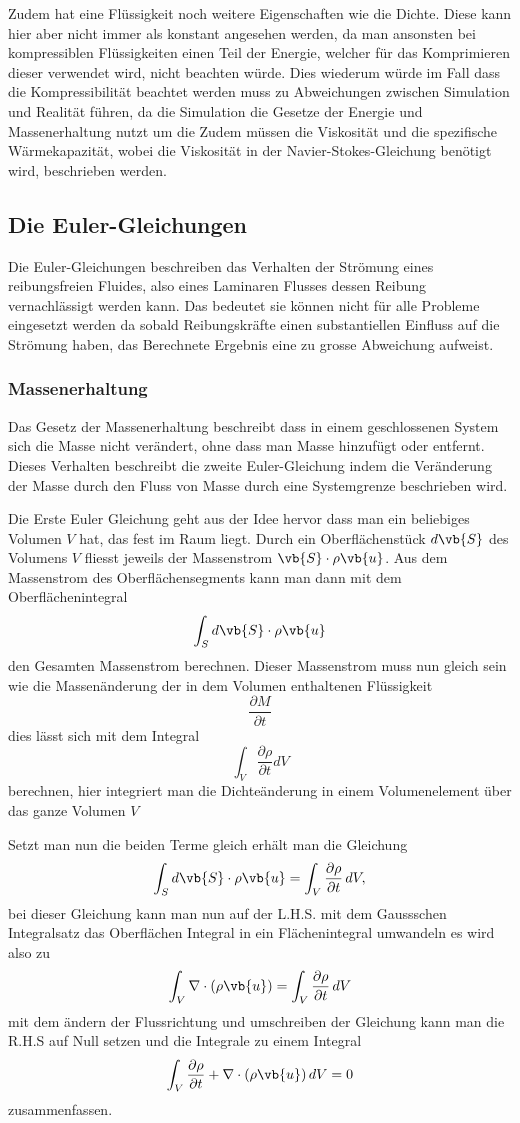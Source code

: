 Zudem hat eine Flüssigkeit noch weitere Eigenschaften wie die Dichte. 
Diese kann hier aber nicht immer als konstant angesehen werden, da man ansonsten bei kompressiblen Flüssigkeiten einen Teil der Energie, welcher für das Komprimieren dieser verwendet wird, nicht beachten würde.
Dies wiederum würde im Fall dass die Kompressibilität beachtet werden muss zu Abweichungen zwischen Simulation und Realität führen, da die Simulation die Gesetze der Energie und Massenerhaltung nutzt um die 
Zudem müssen die Viskosität und die spezifische Wärmekapazität, wobei die Viskosität in der Navier-Stokes-Gleichung benötigt wird, beschrieben werden.

\subsection{Die Euler-Gleichungen}
Die Euler-Gleichungen beschreiben das Verhalten der Strömung eines reibungsfreien Fluides, also eines Laminaren Flusses dessen Reibung vernachlässigt werden kann. 
Das bedeutet sie können nicht für alle Probleme eingesetzt werden da sobald Reibungskräfte einen substantiellen Einfluss auf die Strömung haben, das Berechnete Ergebnis eine zu grosse Abweichung aufweist.

\subsubsection{Massenerhaltung}
Das Gesetz der Massenerhaltung beschreibt dass in einem geschlossenen System sich die Masse nicht verändert, ohne dass man Masse hinzufügt oder entfernt. 
Dieses Verhalten beschreibt die zweite Euler-Gleichung indem die Veränderung der Masse durch den Fluss von Masse durch eine Systemgrenze beschrieben wird.

Die Erste Euler Gleichung geht aus der Idee hervor dass man ein beliebiges Volumen $V$ hat, das fest im Raum liegt. Durch ein Oberflächenstück 
$d \vb{S} $ 
des Volumens 
$V$
 fliesst jeweils der Massenstrom 
$\vb{S} \cdot\rho\vb{u}$.
Aus dem Massenstrom des Oberflächensegments kann man dann mit dem Oberflächenintegral 
\[\int_{S}d\vb{S}\cdot\rho\vb{u}\]
den Gesamten Massenstrom berechnen. Dieser Massenstrom muss nun gleich sein wie die Massenänderung der in dem Volumen enthaltenen Flüssigkeit 
\[\frac{\partial M}{\partial t}\]
dies lässt sich mit dem Integral 
\[\int_{V}\frac{\partial \rho}{\partial t} dV\]
berechnen, hier integriert man die Dichteänderung in einem Volumenelement über das ganze Volumen 
$V$ 

Setzt man nun die beiden Terme gleich erhält man die Gleichung 
\[\int_{S}d\vb{S}\cdot\rho\vb{u} 
=
\int_{V}\frac{\partial \rho}{\partial t} \, dV ,\] 
bei dieser Gleichung kann man nun auf der L.H.S. mit dem Gaussschen Integralsatz das Oberflächen Integral in ein Flächenintegral umwandeln es wird also zu
\[\int_{V}\nabla\cdot(\rho\vb{u}) 
=
\int_{V}\frac{\partial \rho}{\partial t} \, dV \]
mit dem ändern der Flussrichtung und umschreiben der Gleichung kann man die R.H.S auf Null setzen und die Integrale zu einem Integral
\[\int_{V}\frac{\partial \rho}{\partial t} + \nabla\cdot(\rho\vb{u})  \, dV 
= 
0\]
zusammenfassen.

